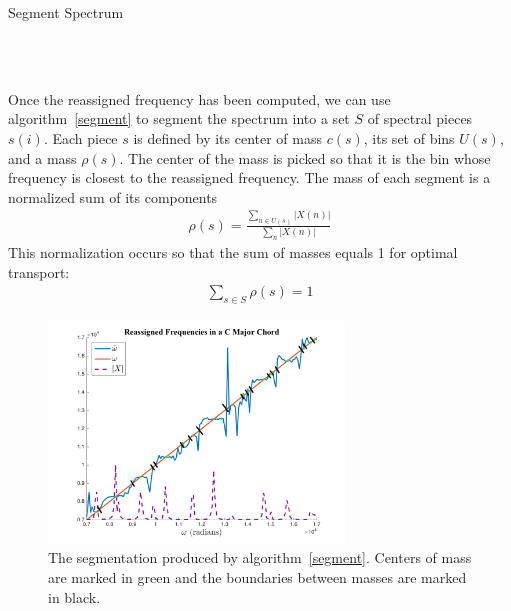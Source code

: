 \documentclass[12pt]{article}
\begin{document}
\begin{algorithm}
  \caption{Segment Spectrum}\label{segment}
\begin{algorithmic}

    \\
      \\
    \EndIf
  \EndFor
\end{algorithmic}
\end{algorithm}
Once the reassigned frequency has been computed, we can use algorithm~\ref{segment} to segment the spectrum into a set $S$ of spectral pieces $s(i)$.
Each piece $s$ is defined by its center of mass $c(s)$, its set of bins $U(s)$, and a mass $\rho(s)$.
The center of the mass is picked so that it is the bin whose frequency is closest to the reassigned frequency.
The mass of each segment is a normalized sum of its components
\begin{align}
  \rho(s) = \frac{\sum_{n\in U(s)}|X(n)|}{\sum_{n}|X(n)|}
\end{align}
This normalization occurs so that the sum of masses equals 1 for optimal transport:
\begin{align}
  \sum_{s\in S} \rho(s) = 1
\end{align}

\begin{figure}[!h]
  \begin{center}
  \includegraphics[width=0.7\textwidth]{figures/SegmentedReassignedFreqCMaj}
  \caption{The segmentation produced by algorithm~\ref{segment}. Centers of mass are marked in green and the boundaries between masses are marked in black.}
  \label{fig:segmentation}
\end{center}
\end{figure}
\end{document}
